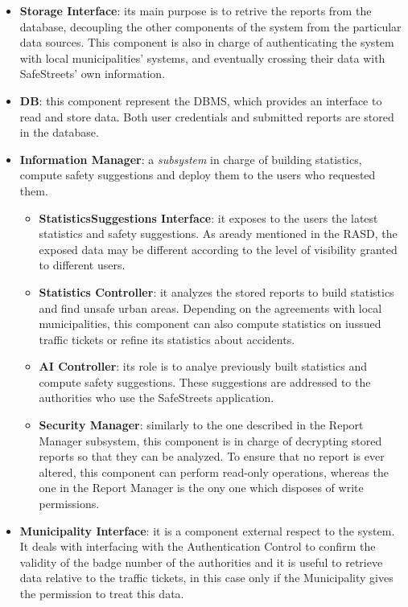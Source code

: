 \documentclass{report}
\begin{document}
\begin{itemize}
\begin{itemize}
\end{itemize}
\item \textbf{Storage Interface}: its main purpose is to retrive the reports from the database, decoupling the other components of the system from the particular data sources. This component is also in charge of authenticating the system with local municipalities' systems, and eventually crossing their data with SafeStreets' own information.
\item \textbf{DB}: this component represent the DBMS, which provides an interface to read and store data. Both user credentials and submitted reports are stored in the database.
\item \textbf{Information Manager}: a \textit{subsystem} in charge of building statistics, compute safety suggestions and deploy them to the users who requested them.
    \begin{itemize}
        \item \textbf{StatisticsSuggestions Interface}: it exposes to the users the latest statistics and safety suggestions. As aready mentioned in the RASD, the exposed data may be different according to the level of visibility granted to different users.
        \item \textbf{Statistics Controller}: it analyzes the stored reports to build statistics and find unsafe urban areas. Depending on the agreements with local municipalities, this component can also compute statistics on iussued traffic tickets or refine its statistics about accidents.
        \item \textbf{AI Controller}: its role is to analye previously built statistics and compute safety suggestions. These suggestions are addressed to the authorities who use the SafeStreets application.
        \item \textbf{Security Manager}: similarly to the one described in the Report Manager subsystem, this component is in charge of decrypting stored reports so that they can be analyzed. To ensure that no report is ever altered, this component can perform read-only operations, whereas the one in the Report Manager is the ony one which disposes of write permissions.
    \end{itemize}
\item \textbf{Municipality Interface}: it is a component external respect to the system. It deals with interfacing with the Authentication Control to confirm the validity of the badge number of the authorities and it is useful to retrieve data relative to the traffic tickets, in this case only if the Municipality gives the permission to treat this data.

\end{itemize}
\end{document}
